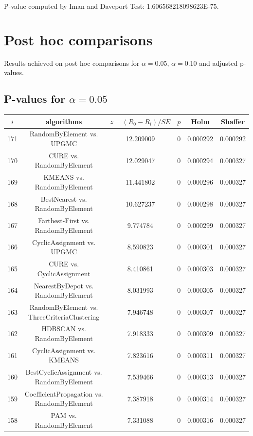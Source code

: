 \documentclass[a4paper,10pt]{article}
\begin{document}
\begin{landscape}
P-value computed by Iman and Daveport Test: 1.606568218098623E-75.\newline



\pagebreak

\section{Post hoc comparisons}

Results achieved on post hoc comparisons for $\alpha = 0.05$, $\alpha = 0.10$ and adjusted p-values.

\subsection{P-values for $\alpha=0.05$}

\begin{table}[!htp]
\centering\scriptsize
\begin{tabular}{cccccc}
$i$&algorithms&$z=(R_0 - R_i)/SE$&$p$&Holm&Shaffer\\
\hline171&RandomByElement vs. UPGMC&12.209009&0&0.000292&0.000292\\
170&CURE vs. RandomByElement&12.029047&0&0.000294&0.000327\\
169&KMEANS vs. RandomByElement&11.441802&0&0.000296&0.000327\\
168&BestNearest vs. RandomByElement&10.627237&0&0.000298&0.000327\\
167&Farthest-First vs. RandomByElement&9.774784&0&0.000299&0.000327\\
166&CyclicAssignment vs. UPGMC&8.590823&0&0.000301&0.000327\\
165&CURE vs. CyclicAssignment&8.410861&0&0.000303&0.000327\\
164&NearestByDepot vs. RandomByElement&8.031993&0&0.000305&0.000327\\
163&RandomByElement vs. ThreeCriteriaClustering&7.946748&0&0.000307&0.000327\\
162&HDBSCAN vs. RandomByElement&7.918333&0&0.000309&0.000327\\
161&CyclicAssignment vs. KMEANS&7.823616&0&0.000311&0.000327\\
160&BestCyclicAssignment vs. RandomByElement&7.539466&0&0.000313&0.000327\\
159&CoefficientPropagation vs. RandomByElement&7.387918&0&0.000314&0.000327\\
158&PAM vs. RandomByElement&7.331088&0&0.000316&0.000327\\

\end{tabular}
\end{table}
\end{landscape}
\end{document}
